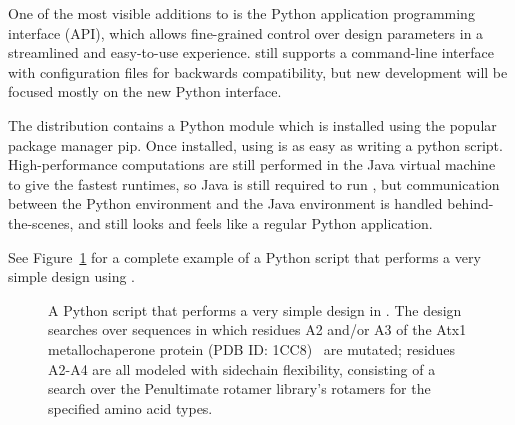 
One of the most visible additions to  is the Python application programming interface (API), which allows fine-grained control over design parameters in a streamlined and easy-to-use experience.  still supports a command-line interface with configuration files for backwards compatibility, but new development will be focused mostly on the new Python interface. %

The  distribution contains a Python module which is installed using the popular package manager {\sc pip}. Once installed, using  is as easy as writing a python script. High-performance computations are still performed in the Java virtual machine to give the fastest runtimes, so Java is still required to run , but communication between the Python environment and the Java environment is handled behind-the-scenes, and  still looks and feels like a regular Python application.

See Figure~\ref{fig:python} for a complete example of a Python script that performs a very simple design using .

\begin{figure}
{
	
}
\caption{A Python script that performs a very simple design in .  The design searches over sequences in which residues A2 and/or A3 of the Atx1 metallochaperone protein (PDB ID: 1CC8)~\cite{1CC8} are mutated; residues A2-A4 are all modeled with sidechain flexibility, consisting of a search over the Penultimate rotamer library\cite{penultimate}'s rotamers for the specified amino acid types.  }
\label{fig:python}
\end{figure}
